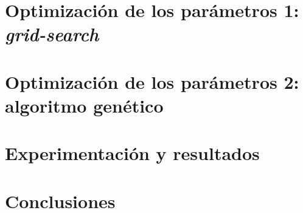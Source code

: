 \documentclass[12pt,a4paper]{article}
\begin{document}
\section{Optimización de los parámetros 1: \textit{grid-search}}



	
	
\newpage

	

\section{Optimización de los parámetros 2: algoritmo genético}



	
	
\newpage

		
	
\section{Experimentación y resultados}




\newpage



\section{Conclusiones}









\end{document}
